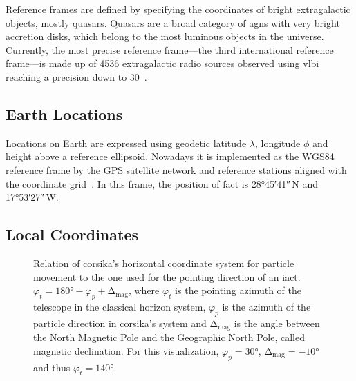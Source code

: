 Reference frames are defined by specifying the coordinates of bright extragalactic 
objects, mostly quasars.
Quasars are a broad category of \glspl{agn} with very bright accretion disks,
which belong to the most luminous objects in the universe.
Currently, the most precise reference frame—the third international reference frame—is made up
of 4536 extragalactic radio sources observed using \gls{vlbi}
reaching a precision down to \SI{30}{}~\cite{icrf3}.


\subsection{Earth Locations}
Locations on Earth are expressed using geodetic latitude $λ$, longitude $ϕ$ and height above
a reference ellipsoid.
Nowadays it is implemented as the WGS84 reference frame by the GPS satellite network and reference stations aligned with the coordinate grid~\cite[Chapter~5]{expl-suppl}.
In this frame, the position of \gls{fact} is \ang{28;45;41}\,N and \ang{17;53;27}\,W.

\subsection{Local Coordinates}
\begin{figure}
  \centering
  
  \caption{%
    Relation of \gls{corsika}'s horizontal coordinate system for particle movement
    to the one used for the pointing direction of an \gls{iact}.
    $φ_t = \ang{180} - φ_p + \increment_{\text{mag}}$, where $φ_t$ is the pointing
    azimuth of the telescope in the classical horizon system, $φ_p$ is the 
    azimuth of the particle direction in \gls{corsika}'s system and $\increment_{\text{mag}}$
    is the angle between the North Magnetic Pole and the Geographic North Pole, called magnetic
    declination.
    For this visualization, $φ_p = \ang{30}$, $\increment_{\text{mag}} = -\ang{10}$ and
    thus $φ_t = \ang{140}$.
  }\label{fig:azimuth}
\end{figure}

